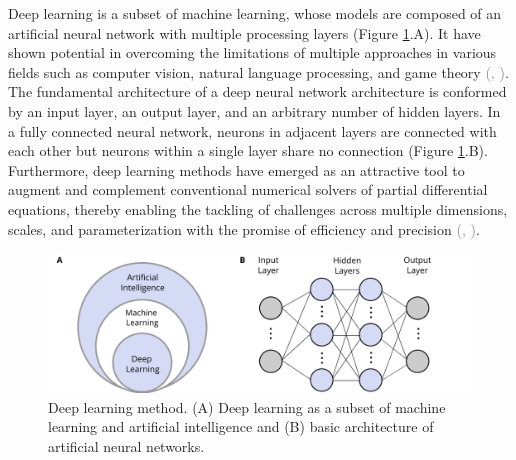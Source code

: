 \documentclass{tufte-handout}
\renewcommand{\citep}[2][]{\textcolor{gray}{(\citeauthor{#2}, \citeyear[#1]{#2})}}
\begin{document}
Deep learning is a subset of machine learning, whose models are composed of an artificial neural network with multiple processing layers (Figure \ref{deep_learning_subset_architecture}.A). It have shown potential in overcoming the limitations of multiple approaches in various fields such as computer vision, natural language processing, and game theory \citep{lecun_deep_2015,goodfellow_deep_2016}. The fundamental architecture of a deep neural network architecture is conformed by an input layer, an output layer, and an arbitrary number of hidden layers. In a fully connected neural network, neurons in adjacent layers are connected with each other but neurons within a single layer share no connection (Figure \ref{deep_learning_subset_architecture}.B). Furthermore, deep learning methods have emerged as an attractive tool to augment and complement conventional numerical solvers of partial differential equations, thereby enabling the tackling of challenges across multiple dimensions, scales, and parameterization with the promise of efficiency and precision \citep{blechschmidt_three_2021}. 




\begin{figure}
    \includegraphics[scale=1]{figs/deep_learning_subset_architecture.pdf}
    \caption{Deep learning method. (A) Deep learning as a subset of machine learning and artificial intelligence and (B) basic architecture of artificial neural networks.}
    \label{deep_learning_subset_architecture}
\end{figure}

\end{document}
